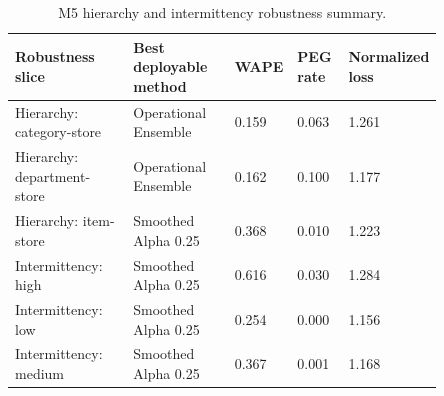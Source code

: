 \begin{table}[htbp]
\centering
\caption{M5 hierarchy and intermittency robustness summary.}
\label{tab:m5-robustness}
\scriptsize
\begin{tabular}{@{}p{0.28\linewidth}p{0.24\linewidth}p{0.11\linewidth}p{0.12\linewidth}p{0.10\linewidth}@{}}
\toprule
\textbf{Robustness slice} & \textbf{Best deployable method} & \textbf{WAPE} & \textbf{PEG rate} & \textbf{Normalized loss} \\
\midrule
Hierarchy: category-store & Operational Ensemble & 0.159 & 0.063 & 1.261 \\
Hierarchy: department-store & Operational Ensemble & 0.162 & 0.100 & 1.177 \\
Hierarchy: item-store & Smoothed Alpha 0.25 & 0.368 & 0.010 & 1.223 \\
Intermittency: high & Smoothed Alpha 0.25 & 0.616 & 0.030 & 1.284 \\
Intermittency: low & Smoothed Alpha 0.25 & 0.254 & 0.000 & 1.156 \\
Intermittency: medium & Smoothed Alpha 0.25 & 0.367 & 0.001 & 1.168 \\
\bottomrule
\end{tabular}
\end{table}

